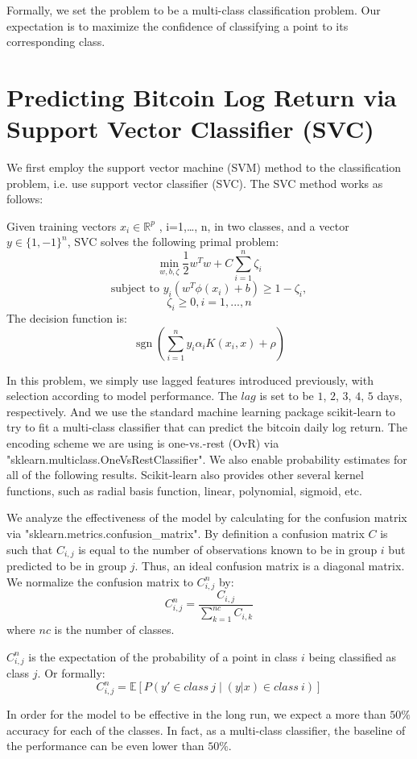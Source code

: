 \documentclass[9pt,twocolumn,twoside]{ilcss}
\begin{document}
Formally, we set the problem to be a multi-class classification problem. Our expectation is to maximize the confidence of classifying a point to its corresponding class.

\section{Predicting Bitcoin Log Return via Support Vector Classifier (SVC)}

We first employ the support vector machine (SVM) method to the classification problem, i.e. use support vector classifier (SVC). The SVC method works as follows:

Given training vectors $x_i \in \mathbb{R}^p$
, i=1,…, n, in two classes, and a vector $y \in \{1, -1\}^n$, SVC solves the following primal problem:
\[\min\limits_{w, b, \zeta} \frac{1}{2} w^T w + C \sum_{i=1}^{n} \zeta_i\]
\[\textrm {subject to } y_i (w^T \phi (x_i) + b) \geq 1 - \zeta_i,\]
\[\zeta_i \geq 0, i=1, ..., n\]
The decision function is:
\[\operatorname{sgn}(\sum_{i=1}^n y_i \alpha_i K(x_i, x) + \rho)\]

In this problem, we simply use lagged features introduced previously, with selection according to model performance. The $lag$ is set to be $1$, $2$, $3$, $4$, $5$ days, respectively. And we use the standard machine learning package scikit-learn to try to fit a multi-class classifier that can predict the bitcoin daily log return. The encoding scheme we are using is one-vs.-rest (OvR) via "sklearn.multiclass.OneVsRestClassifier". We also enable probability estimates for all of the following results. Scikit-learn also provides other several kernel functions, such as radial basis function, linear, polynomial, sigmoid, etc.

We analyze the effectiveness of the model by calculating for the confusion matrix via "sklearn.metrics.confusion\_matrix". By definition a confusion matrix $C$ is such that $C_{i,j}$ is equal to the number of observations known to be in group $i$ but predicted to be in group $j$. Thus, an ideal confusion matrix is a diagonal matrix. We normalize the confusion matrix to $C_{i,j}^{n}$ by:
\[ C_{i,j}^{n} = \frac{C_{i,j}}{\sum_{k=1}^{nc}C_{i,k}} \]
where $nc$ is the number of classes.

$C_{i,j}^{n}$ is the expectation of the probability of a point in class $i$ being classified as class $j$. Or formally:
\[
C_{i,j}^{n} = \mathbb{E}[P(y' \in class \: j \;|\; (y|x) \in class \: i)]
\]

In order for the model to be effective in the long run, we expect a more than $50\%$ accuracy for each of the classes. In fact, as a multi-class classifier, the baseline of the performance can be even lower than $50\%$.
\end{document}
